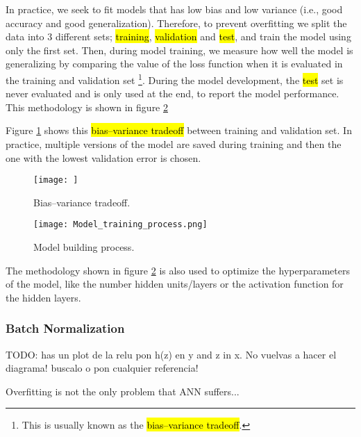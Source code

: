 In practice, we seek to fit models that has low bias and low variance (i.e., good accuracy and good generalization). Therefore, to prevent overfitting we split the data into 3 different sets; \hl{training}, \hl{validation} and \hl{test}, and train the model using only the first set. Then, during model training, we measure how well the model is generalizing by comparing the value of the loss function when it is evaluated in the training and validation set \footnote{This is usually known as the \hl{bias–variance tradeoff}.}.
During the model development, the \hl{test} set is never evaluated and is only used at the end, to report the model performance. This methodology is shown in figure \ref{fig:basics:model_train_process}

Figure \ref{fig:basics:bias_variance} shows this \hl{bias–variance tradeoff} between training and validation set. In practice, multiple versions of the model are saved during training and then the one with the lowest validation error is chosen.

\begin{figure}[!ht]
  \centering
  \texttt{[image: ]}
  \caption{Bias–variance tradeoff.}
  \label{fig:basics:bias_variance}
\end{figure}

\begin{figure}[!ht]
  \centering
  \texttt{[image: Model\_training\_process.png]}
  \caption{Model building process.}
  \label{fig:basics:model_train_process}
\end{figure}

The methodology shown in figure \ref{fig:basics:model_train_process} is also used to optimize the hyperparameters of the model, like the number hidden units/layers or the activation function for the hidden layers.

\subsubsection{Batch Normalization}

TODO: has un plot de la relu pon h(z) en y and z in x. No vuelvas a hacer el diagrama! buscalo o pon cualquier referencia!

Overfitting is not the only problem that ANN suffers...
